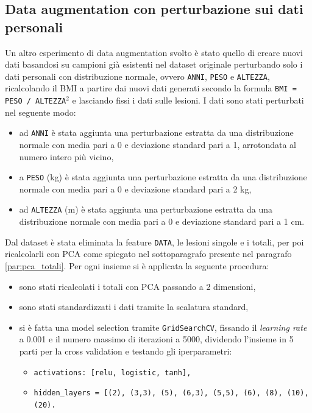 \documentclass[12pt, twoside, letterpaper]{report}
\begin{document}
		\subsection{Data augmentation con perturbazione sui dati personali} \label{sec:data_aug_pers}
			Un altro esperimento di data augmentation svolto è stato quello di creare nuovi dati basandosi su campioni già esistenti nel dataset originale perturbando solo i dati personali con distribuzione normale, ovvero \texttt{ANNI}, \texttt{PESO} e \texttt{ALTEZZA}, ricalcolando il BMI a partire dai nuovi dati generati secondo la formula \texttt{BMI = PESO / ALTEZZA$^2$} e lasciando fissi i dati sulle lesioni. I dati sono stati perturbati nel seguente modo: 
			\begin{itemize}
			\item ad \texttt{ANNI} è stata aggiunta una perturbazione estratta da una distribuzione normale con media pari a 0 e deviazione standard pari a 1, arrotondata al numero intero più vicino,
			\item a \texttt{PESO} (kg) è stata aggiunta una perturbazione estratta da una distribuzione normale con media pari a 0 e deviazione standard pari a 2 kg,
			\item ad \texttt{ALTEZZA} (m) è stata aggiunta una perturbazione estratta da una distribuzione normale con media pari a 0 e deviazione standard pari a 1 cm.
			\end{itemize}
			Dal dataset è stata eliminata la feature \texttt{DATA}, le lesioni singole e i totali, per poi ricalcolarli con PCA come spiegato nel sottoparagrafo \textit{} presente nel paragrafo \ref{par:pca_totali}. Per ogni insieme si è applicata la seguente procedura:
				\begin{itemize}
				\item sono stati ricalcolati i totali con PCA passando a 2 dimensioni,
				\item sono stati standardizzati i dati tramite la scalatura standard,
				\item si è fatta una model selection tramite \texttt{GridSearchCV}, fissando il \textit{learning rate} a 0.001 e il numero massimo di iterazioni a 5000, dividendo l'insieme in 5 parti per la cross validation e testando gli iperparametri:
				 	\begin{itemize}
					\item \texttt{activations: [relu, logistic, tanh],}
    				\item \texttt{hidden\_layers = [(2), (3,3), (5), (6,3), (5,5), (6), (8), (10), (20).}
					\end{itemize}
				 \end{itemize}
\end{document}
